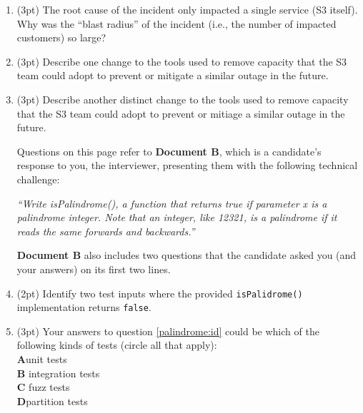 \documentclass{report}
\newif\ifkey
\newcommand{\correct}[1]{\ifkey\color{red}\textbf{#1}\color{black}\else\textbf{#1}\fi\xspace}
\newcommand{\answerlong}[1]{\ifkey\color{red}\textbf{#1}\color{black}\else\vspace{0.5in}\fi\xspace}
\newcommand*{\pts}[1]{\addtocounter{points}{#1}(#1pt)}
\begin{document}
\begin{spacing}{1.4}
\begin{enumerate}[leftmargin=*]
    \item \pts{3} The root cause of the incident only impacted a single service (S3 itself). Why was the ``blast radius''
      of the incident (i.e., the number of impacted customers) so large?\\
      \answerlong{Other services relied on S3, so a cascading failure caused them to fail, as well.}
      
    \item \pts{3} Describe one change to the tools used to remove capacity that the S3 team could adopt to prevent or mitigate
      a similar outage in the future. \\
      \answerlong{Either of the following two answers, which S3 itself gives in the full postmortem, is acceptable. Other
        sensible answers may also get credit or partial credit. 1) modify the tool to remove capacity more slowly, or
        2) add safeguards to prevent capacity from being removed when it will take any subsystem below its minimum required capacity level}

    \item \pts{3} Describe another distinct change to the tools used to remove capacity that the S3 team could adopt to prevent
      or mitiage a similar outage in the future. \\
      \answerlong{See the previous question.}
      
    \newpage

    Questions on this page refer to \textbf{Document B}, which is a candidate's response to you,
    the interviewer, presenting them with the following technical challenge:

    \emph{
      ``Write isPalindrome(), a function that
      returns true if parameter x is a palindrome integer. Note that an integer, like 12321, is a palindrome if it reads the same
      forwards and backwards.''
    }
      
    \textbf{Document B} also includes two questions that the candidate asked you (and your answers) on its first two lines.

  \item \label{palindrome:id} \pts{2} Identify two test inputs where the provided \lstinline{isPalidrome()} implementation returns \lstinline{false}.\\
    \answerlong{Answers will vary. Student solutions must not be a palindrome. {{123}}, {{10}} are potential answers that return
      false.}

  \item \pts{3} Your answers to question \ref{palindrome:id} could be which of the following kinds of tests (circle all that apply):
    \\ \correct{A}\hspace{0.2in}unit tests
    \\ \textbf{B}\hspace{0.2in} integration tests
    \\ \textbf{C}\hspace{0.2in} fuzz tests
    \\ \correct{D}\hspace{0.2in}partition tests


\end{enumerate}
\end{spacing}
\end{document}
